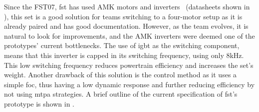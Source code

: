Since the FST07, \gls{fst} has used AMK motors and inverters~\cite{amk:DD5-14-10-POW,amk:KW26-S5-FSE-4Q} (datasheets shown in ), this set is a good solution for teams switching to a four-motor setup as it is already paired and has good documentation. However, as the team evolves, it is natural to look for improvements, and the AMK inverters were deemed one of the prototypes' current bottlenecks. The use of \gls{igbt} as the switching component, means that this inverter is capped in its switching frequency, using only 8kHz. This low switching frequency reduces powertrain efficiency and increases the set's weight. Another drawback of this solution is the control method as it uses a simple \gls{foc}, thus having a low dynamic response and further reducing efficiency by not using \gls{mtpa} strategies.
A brief outline of the current specification of \gls{fst}'s prototype is shown in .

